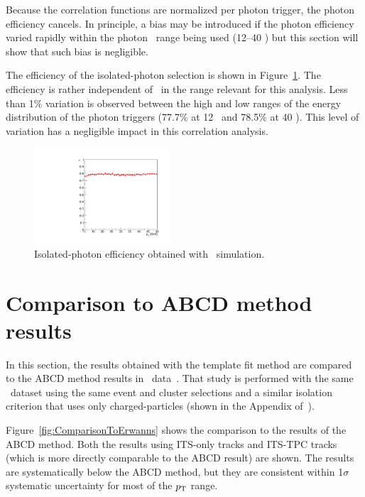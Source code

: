 Because the correlation functions are normalized per photon trigger, the photon efficiency cancels. In principle, a bias may be introduced if the photon efficiency varied rapidly within the photon \pt~range being used (12--40 \GeVc) but this section will show that such bias is negligible.  

The efficiency of the isolated-photon selection is shown in Figure~\ref{fig:photonEff_pPb}. The efficiency is rather independent of \pt~in the range relevant for this analysis. Less than 1\% variation is observed between the high and low ranges of the energy distribution of the photon triggers (77.7\% at 12 \GeVc~and 78.5\% at 40 \GeVc). This level of variation has a negligible impact in this correlation analysis. 
\begin{figure}
\centering
\includegraphics[width=0.45\textwidth]{Checks_Systematics/Efficiency_photon_pPb}
\caption{Isolated-photon efficiency obtained with \pPb~simulation.}
\label{fig:photonEff_pPb}
\end{figure}

\section{Comparison to ABCD method results}
\label{sec:comparisontoABCD}
In this section, the results obtained with the template fit method are compared to the ABCD method results in \pPb~data~\cite{Erwann}. That study is performed with the same \pPb~dataset using the same event and cluster selections and a similar isolation criterion that uses only charged-particles (shown in the Appendix of~\cite{Erwann}).

Figure~\ref{fig:ComparisonToErwanns} shows the comparison to the results of the ABCD method. Both the results using ITS-only tracks and ITS-TPC tracks (which is more directly comparable to the ABCD result) are shown. The results are systematically below the ABCD method, but they are consistent within 1$\sigma$ systematic uncertainty for most of the $p_{\mathrm{T}}$ range. 

